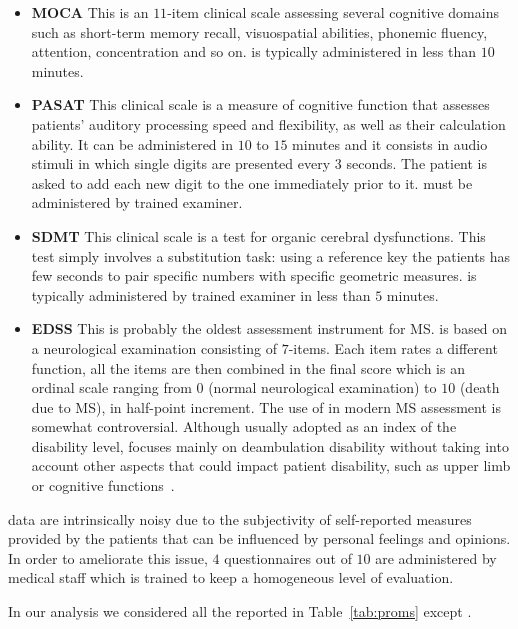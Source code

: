 \begin{itemize}
	\item[] {\sc \textbf{MOCA}} This is an $11$-item clinical scale assessing several cognitive domains such as short-term memory recall, visuospatial abilities, phonemic fluency, attention, concentration and so on. \MOCA is typically administered in less than $10$ minutes.
	
	\item[] {\sc \textbf{PASAT}} This clinical scale is a measure of cognitive function that assesses patients' auditory processing speed and flexibility,  as well as their calculation ability. It can be administered in $10$ to $15$ minutes and it consists in audio stimuli in which single digits are presented every $3$ seconds. The patient is asked to add each new digit to the one immediately prior to it. \PASAT must be administered by trained examiner.
	
	\item[] {\sc \textbf{SDMT}} This clinical scale is a test for organic cerebral dysfunctions. This test simply involves a substitution task: using a reference key the patients has few seconds to pair specific numbers with specific geometric measures.
	\SDMT is typically administered by trained examiner in less than $5$ minutes.
	
	\item[] {\sc \textbf{EDSS}} This is probably the oldest assessment instrument for MS. \EDSS is based on a neurological examination consisting of $7$-items. Each item rates a different function, all the items are then combined in the final \EDSS score which is an ordinal scale ranging from $0$ (normal neurological examination) to $10$ (death due to MS), in half-point increment. The use of \EDSS in modern MS assessment is somewhat controversial. Although usually adopted as an index of the disability level, \EDSS focuses mainly on deambulation disability without taking into account other aspects that could impact patient disability, such as upper limb or cognitive functions~\cite{meyer2014systematic, uitdehaag2014clinical}.
	
	
\end{itemize}

\PCO data are intrinsically noisy due to the subjectivity of self-reported measures provided by the patients that can be influenced by personal feelings and opinions. In order to ameliorate this issue, $4$ questionnaires out of $10$ are administered by medical staff which is trained to keep a homogeneous level of evaluation.

In our analysis we considered all the \PCOs reported in Table~\ref{tab:proms} except \EDSS.

